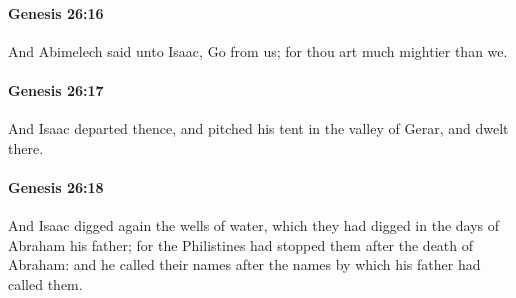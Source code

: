 		\paragraph{Genesis 26:16} %
			\label{GENESIS-26-16}

			And Abimelech said unto Isaac, Go from us; for thou art much mightier than we.


		\paragraph{Genesis 26:17} %
			\label{GENESIS-26-17}

			And Isaac departed thence, and pitched his tent in the valley of Gerar, and dwelt there.


		\paragraph{Genesis 26:18} %
			\label{GENESIS-26-18}

			And Isaac digged again the wells of water, which they had digged in the days of Abraham his father; for the Philistines had stopped them after the death of Abraham: and he called their names after the names by which his father had called them.


